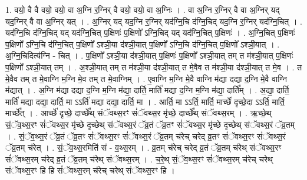 \documentclass[17pt]{extarticle}
\begin{document}
1. वयो॒ वै वै वयो॒ वयो॒ वा अ॒ग्नि र॒ग्निर् वै वयो॒ वयो॒ वा अ॒ग्निः । . वा अ॒ग्नि र॒ग्निर् वै वा अ॒ग्निर् यद् यद॒ग्निर् वै वा अ॒ग्निर् यत् । . अ॒ग्निर् यद् यद॒ग्नि र॒ग्निर् यद॑ग्नि॒चि द॑ग्नि॒चिद् यद॒ग्नि र॒ग्निर् यद॑ग्नि॒चित् । . यद॑ग्नि॒चि द॑ग्नि॒चिद् यद् यद॑ग्नि॒चित् प॒क्षिणः॑ प॒क्षिणो᳚ ऽग्नि॒चिद् यद् यद॑ग्नि॒चित् प॒क्षिणः॑ । . अ॒ग्नि॒चित् प॒क्षिणः॑ प॒क्षिणो᳚ ऽग्नि॒चि द॑ग्नि॒चित् प॒क्षिणो᳚ ऽश्ञी॒या द॑श्ञी॒यात् प॒क्षिणो᳚ ऽग्नि॒चि द॑ग्नि॒चित् प॒क्षिणो᳚ ऽश्ञी॒यात् । . अ॒ग्नि॒चिदित्य॑ग्नि - चित् । . प॒क्षिणो᳚ ऽश्ञी॒या द॑श्ञी॒यात् प॒क्षिणः॑ प॒क्षिणो᳚ ऽश्ञी॒यात् तम् त म॑श्ञी॒यात् प॒क्षिणः॑ प॒क्षिणो᳚ ऽश्ञी॒यात् तम् । . अ॒श्ञी॒यात् तम् त म॑श्ञी॒या द॑श्ञी॒यात् त मे॒वैव त म॑श्ञी॒या द॑श्ञी॒यात् त मे॒व । . त मे॒वैव तम् त मे॒वाग्नि म॒ग्नि मे॒व तम् त मे॒वाग्निम् । . ए॒वाग्नि म॒ग्नि मे॒वै वाग्नि म॑द्या दद्या द॒ग्नि मे॒वै वाग्नि म॑द्यात् । . अ॒ग्नि म॑द्या दद्या द॒ग्नि म॒ग्नि म॑द्या॒ दार्ति॒ मार्ति॑ मद्या द॒ग्नि म॒ग्नि म॑द्या॒ दार्ति᳚म् । . अ॒द्या॒ दार्ति॒ मार्ति॑ मद्या दद्या॒ दार्ति॒ मा ऽऽर्ति॑ मद्या दद्या॒ दार्ति॒ मा । . आर्ति॒ मा ऽऽर्ति॒ मार्ति॒ मार्च्छे॑ दृच्छे॒दा ऽऽर्ति॒ मार्ति॒ मार्च्छे᳚त् । . आर्च्छे॑ दृच्छे॒ दार्च्छे᳚थ् संॅवथ्स॒रꣳ सं॑ॅवथ्स॒र मृ॑च्छे॒ दार्च्छे᳚थ् संॅवथ्स॒रम् । . ऋ॒च्छे॒थ् सं॒ॅव॒थ्स॒रꣳ सं॑ॅवथ्स॒र मृ॑च्छे दृच्छेथ् संॅवथ्स॒रं ॅव्र॒तं ॅव्र॒तꣳ सं॑ॅवथ्स॒र मृ॑च्छे दृच्छेथ् संॅवथ्स॒रं ॅव्र॒तम् । . सं॒ॅव॒थ्स॒रं ॅव्र॒तं ॅव्र॒तꣳ सं॑ॅवथ्स॒रꣳ सं॑ॅवथ्स॒रं ॅव्र॒तम् च॑रेच् चरेद् व्र॒तꣳ सं॑ॅवथ्स॒रꣳ सं॑ॅवथ्स॒रं ॅव्र॒तम् च॑रेत् । . सं॒ॅव॒थ्स॒रमिति॑ सं - व॒थ्स॒रम् । . व्र॒तम् च॑रेच् चरेद् व्र॒तं ॅव्र॒तम् च॑रेथ् संॅवथ्स॒रꣳ सं॑ॅवथ्स॒रम् च॑रेद् व्र॒तं ॅव्र॒तम् च॑रेथ् संॅवथ्स॒रम् । . च॒रे॒थ् सं॒ॅव॒थ्स॒रꣳ सं॑ॅवथ्स॒रम् च॑रेच् चरेथ् संॅवथ्स॒रꣳ हि हि सं॑ॅवथ्स॒रम् च॑रेच् चरेथ् संॅवथ्स॒रꣳ हि । \newline
\end{document}
